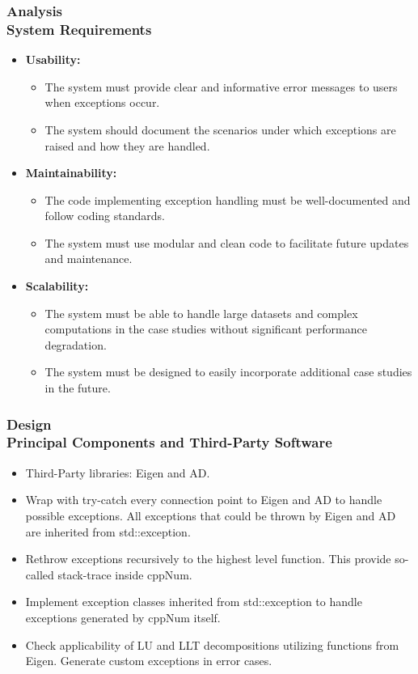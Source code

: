 \documentclass[ucs,10pt]{beamer}
\begin{document}
\begin{frame}
\frametitle{Analysis \\
	\small \color{rwth-blue} System Requirements}
	\begin{itemize}	
            \item \textbf{Usability:}
		\begin{itemize}
			\item The system must provide clear and informative error messages to users when exceptions occur.
			\item The system should document the scenarios under which exceptions are raised and how they are handled.
		\end{itemize}
		\item \textbf{Maintainability:}
		\begin{itemize}
			\item The code implementing exception handling must be well-documented and follow coding standards.
			\item The system must use modular and clean code to facilitate future updates and maintenance.
		\end{itemize}
		\item \textbf{Scalability:}
		\begin{itemize}
			\item The system must be able to handle large datasets and complex computations in the case studies without significant performance degradation.
			\item The system must be designed to easily incorporate additional case studies in the future.
		\end{itemize}
	\end{itemize}
\end{frame}

\begin{frame}
\frametitle{Design \\
	\small \color{rwth-blue} Principal Components and Third-Party Software}
	\begin{itemize}
		\item Third-Party libraries: Eigen and AD.
		\item Wrap with try-catch every connection point to Eigen and AD to handle possible exceptions. All exceptions that could be thrown by Eigen and AD are inherited from std::exception.
		\item Rethrow exceptions recursively to the highest level function. This provide so-called stack-trace inside cppNum.
		\item Implement exception classes inherited from std::exception to handle exceptions generated by cppNum itself.
		\item Check applicability of LU and LLT decompositions utilizing functions from Eigen. Generate custom exceptions in error cases.
	\end{itemize}
\end{frame}
\end{document}
